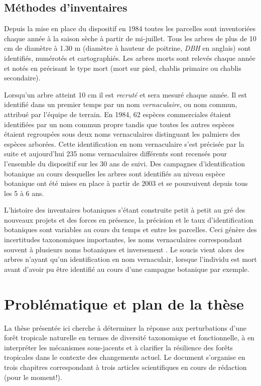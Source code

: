 \documentclass[
  11pt,
  french,
  A4paper,
  extrafontsizes,onecolumn,openright
  ]{memoir}
\begin{document}
\subsection{Méthodes d'inventaires}\label{methodes-dinventaires}

Depuis la mise en place du dispositif en 1984 toutes les parcelles sont
inventoriées chaque année à la saison sèche à partir de mi-juillet. Tous
les arbres de plus de 10 cm de diamètre à 1.30 m (diamètre à hauteur de
poitrine, \emph{DBH} en anglais) sont identifiés, numérotés et
cartographiés. Les arbres morts sont relevés chaque année et notés en
précisant le type mort (mort sur pied, chablis primaire ou chablis
secondaire).

Lorsqu'un arbre atteint 10 cm il est \emph{recruté} et sera mesuré
chaque année. Il est identifié dans un premier temps par un nom
\emph{vernaculaire}, ou nom commun, attribué par l'équipe de terrain. En
1984, 62 espèces commerciales étaient identifiées par un nom commun
propre tandis que toutes les autres espèces étaient regroupées sous deux
noms vernaculaires distinguant les palmiers des espèces arborées. Cette
identification en nom vernaculaire s'est précisée par la suite et
aujourd'hui 235 noms vernaculaires différents sont recensés pour
l'ensemble du dispositif sur les 30 ans de suivi. Des campagnes
d'identification botanique au cours desquelles les arbres sont
identifiés au niveau espèce botanique ont été mises en place à partir de
2003 et se poursuivent depuis tous les 5 à 6 ans.

L'histoire des inventaires botaniques s'étant construite petit à petit
au gré des nouveaux projets et des forces en présence, la précision et
le taux d'identification botaniques sont variables au cours du temps et
entre les parcelles. Ceci génère des incertitudes taxonomiques
importantes, les noms vernaculaires correspondant souvent à plusieurs
noms botaniques et inversement \autocite{Oldeman1968}. Le soucis vient
alors des arbres n'ayant qu'un identification en nom vernaculair,
lorsque l'individu est mort avant d'avoir pu être identifié au cours
d'une campagne botanique par exemple.

\section{Problématique et plan de la
thèse}\label{problematique-et-plan-de-la-these}

La thèse présentée ici cherche à déterminer la réponse aux perturbations
d'une forêt tropicale naturelle en termes de diversité taxonomique et
fonctionnelle, à en interpréter les mécanismes sous-jacents et à
clarifier la résilience des forêts tropicales dans le contexte des
changements actuel. Le document s'organise en trois chapitres
correspondant à trois articles scientifiques en cours de rédaction (pour
le moment!).
\end{document}
